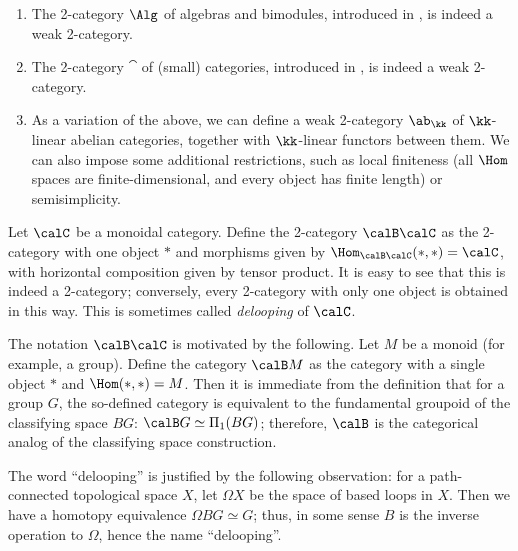 \begin{example}\label{x:weak-2cat-examples}\par\noindent
  \begin{enumerate}
    \item The 2-category $\Alg$ of algebras and bimodules,
      introduced in , is
      indeed a weak 2-category.
    \item The 2-category $\cat$ of (small) categories,
      introduced in , is indeed a weak 2-category.
    \item As a variation of the above, we can define a weak 2-category $\ab_\kk$
      of $\kk$-linear abelian categories, together with $\kk$-linear functors
      between them. We can also impose some additional restrictions, such as
      local finiteness (all $\Hom$ spaces are finite-dimensional, and every
      object has finite length) or semisimplicity.
  \end{enumerate}
\end{example}
\begin{example}\label{x:BC}
  Let $\calC$ be a monoidal category. Define the 2-category $\calB\calC$ as the
  2-category with one object $*$ and morphisms given by $\Hom_{\calB\calC}(*,*)
  =\calC$, with horizontal composition given by tensor product.
  It is easy to see that this is indeed a 2-category;
  conversely, every 2-category with only one object is obtained in this
  way. This is sometimes called \emph{delooping} of $\calC$.
\end{example}

\begin{remark}\label{r:BG}
    The notation $\calB\calC$ is motivated by the following. Let $M$ be a
    monoid (for example, a group). Define the category $\calB M$ as the
    category with a single object $*$ and $\Hom(*,*)=M$. Then it is immediate
    from the definition that for a group $G$, the so-defined category is
    equivalent to the fundamental groupoid of the classifying space $BG$:
    $\calB G\simeq \Pi_1(BG)$; therefore, $\calB$ is the categorical analog of
    the classifying space construction.

  The word ``delooping'' is justified by the following observation: for a
  path-connected topological space $X$, let $\Omega X$ be the space of based
  loops in $X$. Then we have a homotopy equivalence $\Omega BG \simeq G$; thus,
  in some sense $B$ is the inverse operation to $\Omega$, hence the name
  ``delooping''.
\end{remark}

